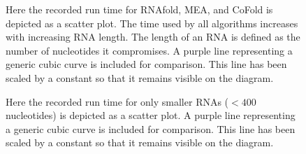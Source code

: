 \documentclass[12pt, a4paper]{article}
\begin{document}
\begin{figure}
\begin{center}
\end{center}
\caption{Here the recorded run time for RNAfold, MEA, and CoFold is depicted as a scatter plot. The time used by all algorithms increases with increasing RNA length. The length of an RNA is defined as the number of nucleotides it compromises. A purple line representing a generic cubic curve is included for comparison. This line has been scaled by a constant so that it remains visible on the diagram.}
\label{fig:timegraph}
\end{figure}


\begin{figure}
\begin{center}
\end{center}
\caption{Here the recorded run time for only smaller RNAs ($< 400$ nucleotides) is depicted as a scatter plot. A purple line representing a generic cubic curve is included for comparison. This line has been scaled by a constant so that it remains visible on the diagram.}
\label{fig:timegraphsmall}
\end{figure}
\end{document}
